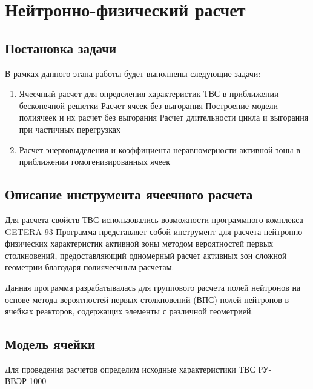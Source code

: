 \section{Нейтронно-физический расчет}

\subsection{Постановка задачи}
В рамках данного этапа работы будет выполнены следующие задачи:
\begin{enumerate}
    \item Ячеечный расчет для определения характеристик ТВС в приближении бесконечной решетки
        \subitem Расчет ячеек без выгорания
        \subitem Построение модели полиячеек и их расчет без выгорания
        \subitem Расчет длительности цикла и выгорания при частичных перегрузках
    \item Расчет энерговыделения и коэффициента неравномерности активной зоны в приближении гомогенизированных ячеек
\end{enumerate}

\subsection{Описание инструмента ячеечного расчета}
Для расчета свойств ТВС использовались возможности программного комплекса GETERA-93 %
Программа представляет собой инструмент для расчета нейтронно-физических характеристик активной зоны методом вероятностей первых столкновений, предоставляющий одномерный расчет активных зон сложной геометрии благодаря полиячеечным расчетам.

Данная программа разрабатывалась для группового расчета полей нейтронов на основе метода вероятностей первых столкновений (ВПС) полей нейтронов в ячейках реакторов, содержащих элементы с различной геометрией.
\subsection{Модель ячейки}
Для проведения расчетов определим исходные характеристики ТВС РУ-ВВЭР-1000 %

